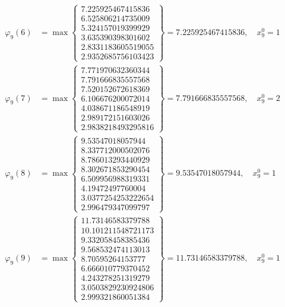 \documentclass{article}
\begin{document}
\begin{align*}
  
\varphi_{9}(6) &= \max \left\{ \begin{array}{c}
7.225925467415836 \\
 6.525806214735009 \\
 5.324157019399929 \\
 3.635390398301602 \\
 2.8331183605519055 \\
 2.9352685756103423
\end{array} \right\} = 7.225925467415836, \quad x_{9}^0 = 1\\
  
  
  
  
\varphi_{9}(7) &= \max \left\{ \begin{array}{c}
7.771970632360344 \\
 7.791666835557568 \\
 7.520152672618369 \\
 6.106676200072014 \\
 4.038671186548919 \\
 2.989172151603026 \\
 2.9838218493295816
\end{array} \right\} = 7.791666835557568, \quad x_{9}^0 = 2\\
  
  
  
  
\varphi_{9}(8) &= \max \left\{ \begin{array}{c}
9.53547018057944 \\
 8.337712000502076 \\
 8.786013293440929 \\
 8.302671853290454 \\
 6.509956988319331 \\
 4.19472497760004 \\
 3.0377254253222654 \\
 2.996479347099797
\end{array} \right\} = 9.53547018057944, \quad x_{9}^0 = 1\\
  
  
  
  
\varphi_{9}(9) &= \max \left\{ \begin{array}{c}
11.73146583379788 \\
 10.101211548721173 \\
 9.332058458385436 \\
 9.568532474113013 \\
 8.70595264153777 \\
 6.666010779370452 \\
 4.243278251319279 \\
 3.0503829230924806 \\
 2.999321860051384
\end{array} \right\} = 11.73146583379788, \quad x_{9}^0 = 1\\
  

\end{align*}
\end{document}
